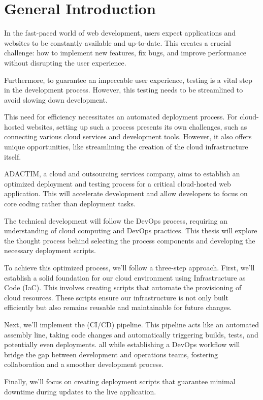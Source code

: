 \chapter*{General Introduction}
\noindent In the fast-paced world of web development, users expect applications and websites to be constantly available and up-to-date. This creates a crucial challenge: how to implement new features, fix bugs, and improve performance without disrupting the user experience.
\par
\noindent Furthermore, to guarantee an impeccable user experience, testing is a vital step in the development process. However, this testing needs to be streamlined to avoid slowing down development.
\par
\noindent This need for efficiency necessitates an automated deployment process. For cloud-hosted websites, setting up such a process presents its own challenges, such as connecting various cloud services and development tools. However, it also offers unique opportunities, like streamlining the creation of the cloud infrastructure itself.
\par 
\noindent ADACTIM, a cloud and outsourcing services company, aims to establish an optimized deployment and testing process for a critical cloud-hosted web application. This will accelerate development and allow developers to focus on core coding rather than deployment tasks.
\par 
\noindent The technical development will follow the DevOps process, requiring an understanding of cloud computing and DevOps practices. This thesis will explore the thought process behind selecting the process components and developing the necessary deployment scripts.
\par 
\noindent To achieve this optimized process, we'll follow a three-step approach. First, we'll establish a solid foundation for our cloud environment using Infrastructure as Code (IaC). This involves creating scripts that automate the provisioning of cloud resources. These scripts ensure our infrastructure is not only built efficiently but also remains reusable and maintainable for future changes.
\par
\noindent Next, we'll implement the (CI/CD) pipeline. This pipeline acts like an automated assembly line, taking code changes and automatically triggering builds, tests, and potentially even deployments. all while establishing a DevOps workflow will bridge the gap between development and operations teams, fostering collaboration and a smoother development process.
\par
\noindent Finally, we'll focus on creating deployment scripts that guarantee minimal downtime during updates to the live application.